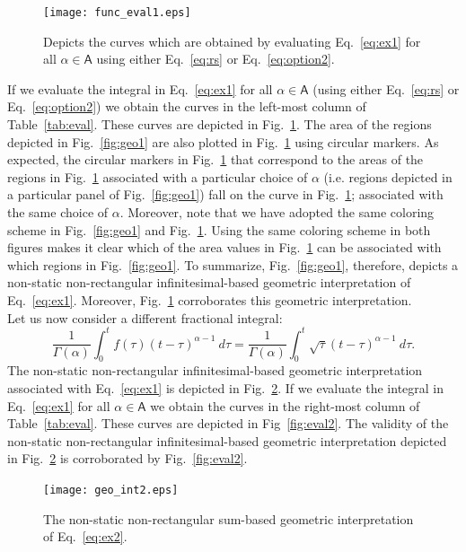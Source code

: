 \documentclass[twoside,reqno,11pt]{fcaa-var} %
\begin{document}
\begin{figure}[htb]
\centering
\texttt{[image: func\_eval1.eps]}
\caption{Depicts the curves which are obtained by evaluating Eq.~\eqref{eq:ex1} for all $\alpha\in \mathsf{A}$ using either Eq.~\eqref{eq:rs} or Eq.~\eqref{eq:option2}.}
\label{fig:eval1}
\end{figure}

\noindent
If we evaluate the integral in Eq.~\eqref{eq:ex1} for all $\alpha\in \mathsf{A}$ (using either Eq.~\eqref{eq:rs} or Eq.~\eqref{eq:option2}) we obtain the curves in the 
left-most column of Table~\ref{tab:eval}. These curves are depicted in Fig.~\ref{fig:eval1}.
The area of the regions depicted in Fig.~\ref{fig:geo1} are also plotted in Fig.~\ref{fig:eval1} using circular markers. As expected, the circular markers in Fig.~\ref{fig:eval1} that correspond to the areas of the regions in Fig.~\ref{fig:eval1}  
associated with a particular choice of $\alpha$ (i.e. regions depicted in a particular panel of Fig.~\ref{fig:geo1}) fall on the curve in Fig.~\ref{fig:eval1}; associated with the same choice of $\alpha$. Moreover, note that we have adopted the 
same coloring scheme in Fig.~\ref{fig:geo1} and Fig.~\ref{fig:eval1}. Using the same coloring scheme in both figures makes it clear which of the area values in Fig.~\ref{fig:eval1} can be associated with which regions in Fig.~\ref{fig:geo1}.
To summarize, Fig.~\ref{fig:geo1}, therefore, depicts a non-static non-rectangular infinitesimal-based geometric interpretation of Eq.~\eqref{eq:ex1}. Moreover, Fig.~\ref{fig:eval1} corroborates this geometric interpretation.\\

\noindent
Let us now consider a different fractional integral:
\begin{equation}
\label{eq:ex2}
\frac{1}{\Gamma(\alpha)}\int_0^t f(\tau) (t-\tau)^{\alpha-1}~d\tau = \frac{1}{\Gamma(\alpha)}\int_0^t \sqrt{\tau}(t-\tau)^{\alpha-1}~d\tau. 
\end{equation}
The non-static non-rectangular infinitesimal-based geometric interpretation associated with Eq.~\eqref{eq:ex1} is depicted in Fig.~\ref{fig:geo2}. 
If we evaluate the integral in Eq.~\eqref{eq:ex1} for all $\alpha\in \mathsf{A}$ we obtain the curves in the right-most column of Table~\ref{tab:eval}. 
These curves are depicted in Fig~\ref{fig:eval2}.
The validity of the non-static non-rectangular infinitesimal-based geometric interpretation depicted in Fig.~\ref{fig:geo2} is corroborated by Fig.~\ref{fig:eval2}. 

\begin{figure}[htb]
\centering
\texttt{[image: geo\_int2.eps]}
\caption{The non-static non-rectangular sum-based geometric interpretation of Eq.~\eqref{eq:ex2}.}
\label{fig:geo2}
\end{figure}
\end{document}

